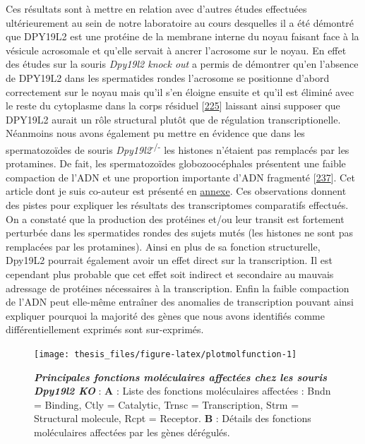 \documentclass[12pt,a4paper,twoside]{ugathesis}
\theoremstyle{definition}
\theoremstyle{definition}
\theoremstyle{definition}
\theoremstyle{remark}
\begin{document}
Ces résultats sont à mettre en relation avec d'autres études effectuées
ultérieurement au sein de notre laboratoire au cours desquelles il a été
démontré que DPY19L2 est une protéine de la membrane interne du noyau
faisant face à la vésicule acrosomale et qu'elle servait à ancrer
l'acrosome sur le noyau. En effet des études sur la souris \emph{Dpy19l2
knock out} a permis de démontrer qu'en l'absence de DPY19L2 dans les
spermatides rondes l'acrosome se positionne d'abord correctement sur le
noyau mais qu'il s'en éloigne ensuite et qu'il est éliminé avec le reste
du cytoplasme dans la corps résiduel
{[}\protect\hyperlink{ref-Pierre2012}{225}{]} laissant ainsi supposer
que DPY19L2 aurait un rôle structural plutôt que de régulation
transcriptionelle. Néanmoins nous avons également pu mettre en évidence
que dans les spermatozoïdes de souris
\emph{Dpy19l2}\textsuperscript{-/-} les histones n'étaient pas remplacés
par les protamines. De fait, les spermatozoïdes globozoocéphales
présentent une faible compaction de l'ADN et une proportion importante
d'ADN fragmenté {[}\protect\hyperlink{ref-Yassine2015a}{237}{]}. Cet
article dont je suis co-auteur est présenté en
\protect\hyperlink{dpy2015}{annexe}. Ces observations donnent des pistes
pour expliquer les résultats des transcriptomes comparatifs effectués.
On a constaté que la production des protéines et/ou leur transit est
fortement perturbée dans les spermatides rondes des sujets mutés (les
histones ne sont pas remplacées par les protamines). Ainsi en plus de sa
fonction structurelle, Dpy19L2 pourrait également avoir un effet direct
sur la transcription. Il est cependant plus probable que cet effet soit
indirect et secondaire au mauvais adressage de protéines nécessaires à
la transcription. Enfin la faible compaction de l'ADN peut elle-même
entraîner des anomalies de transcription pouvant ainsi expliquer
pourquoi la majorité des gènes que nous avons identifiés comme
différentiellement exprimés sont sur-exprimés.

\newpage

\begin{figure}

{\centering \texttt{[image: thesis\_files/figure-latex/plotmolfunction-1]} 

}

\caption[Principales fonctions moléculaires affectées
chez les souris \emph{Dpy19l2} KO\\]{\textbf{\emph{Principales fonctions moléculaires
affectées chez les souris \emph{Dpy19l2} KO}} : \textbf{A} : Liste des
fonctions moléculaires affectées : Bndn = Binding, Ctly = Catalytic,
Trnsc = Transcription, Strm = Structural molecule, Rcpt = Receptor.
\textbf{B} : Détails des fonctions moléculaires affectées par les gènes
dérégulés.}\label{fig:plotmolfunction}
\end{figure}
\end{document}
